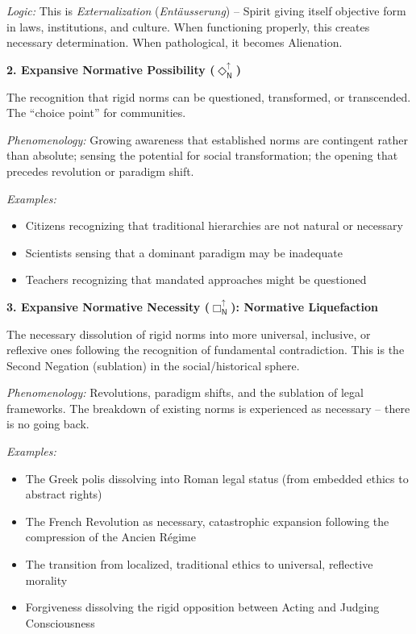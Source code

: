 \documentclass[12pt]{book}
\newcommand{\NBoxUp}{\Box_{\mathsf{N}}^{\uparrow}}
\newcommand{\NDiaUp}{\Diamond_{\mathsf{N}}^{\uparrow}}
\begin{document}
\textit{Logic:} This is \textit{Externalization} (\emph{Entäusserung}) -- Spirit giving itself objective form in laws, institutions, and culture. When functioning properly, this creates necessary determination. When pathological, it becomes Alienation.

\bigskip

\noindent\textbf{2. Expansive Normative Possibility ($\NDiaUp$)}

The recognition that rigid norms can be questioned, transformed, or transcended. The ``choice point'' for communities.

\textit{Phenomenology:} Growing awareness that established norms are contingent rather than absolute; sensing the potential for social transformation; the opening that precedes revolution or paradigm shift.

\textit{Examples:}
\begin{itemize}
\item Citizens recognizing that traditional hierarchies are not natural or necessary
\item Scientists sensing that a dominant paradigm may be inadequate
\item Teachers recognizing that mandated approaches might be questioned
\end{itemize}

\bigskip

\noindent\textbf{3. Expansive Normative Necessity ($\NBoxUp$): Normative Liquefaction}

The necessary dissolution of rigid norms into more universal, inclusive, or reflexive ones following the recognition of fundamental contradiction. This is the Second Negation (sublation) in the social/historical sphere.

\textit{Phenomenology:} Revolutions, paradigm shifts, and the sublation of legal frameworks. The breakdown of existing norms is experienced as necessary -- there is no going back.

\textit{Examples:}
\begin{itemize}
\item The Greek polis dissolving into Roman legal status (from embedded ethics to abstract rights)
\item The French Revolution as necessary, catastrophic expansion following the compression of the Ancien Régime
\item The transition from localized, traditional ethics to universal, reflective morality
\item Forgiveness dissolving the rigid opposition between Acting and Judging Consciousness
\end{itemize}
\end{document}
